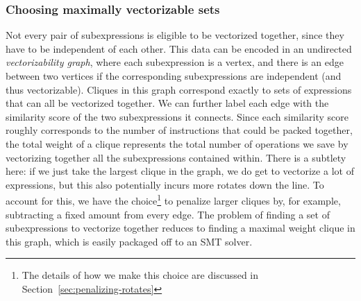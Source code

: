 \subsubsection*{Choosing maximally vectorizable sets}%
Not every pair of subexpressions is eligible to be vectorized together, since they have to be independent of each other.
This data can be encoded in an undirected {\em vectorizability graph}, where each subexpression is a vertex, and there is an edge between two vertices if the corresponding subexpressions are independent (and thus vectorizable).
Cliques in this graph correspond exactly to sets of expressions that can all be vectorized together. 
We can further label each edge with the similarity score of the two subexpressions it connects.
Since each similarity score roughly corresponds to the number of instructions that could be packed together, the total weight of a clique represents the total number of operations we save by vectorizing together all the subexpressions contained within. 
There is a subtlety here: if we just take the largest clique in the graph, we do get to vectorize a lot of expressions, but this also potentially incurs more rotates down the line.
To account for this, we have the choice\footnote{The details of how we make this choice are discussed in Section~\ref{sec:penalizing-rotates}} to penalize larger cliques by, for example, subtracting a fixed amount from every edge.
The problem of finding a set of subexpressions to vectorize together reduces to finding a maximal weight clique in this graph, which is easily packaged off to an SMT solver.

